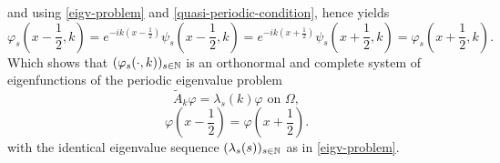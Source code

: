 and using \eqref{eigv-problem} and \eqref{quasi-periodic-condition}, hence yields
		\[ \varphi_{s}(x - \frac{1}{2}, k) = e^{-ik(x - \frac{1}{2})} \psi_{s}(x - \frac{1}{2}, k) = e^{-ik(x + \frac{1}{2})} \psi_{s}(x + \frac{1}{2}, k) = \varphi_{s}(x + \frac{1}{2}, k). \]
Which shows that $(\varphi_{s}(\cdot, k))_{s \in \mathbb{N}}$ is an orthonormal and complete system of eigenfunctions of the periodic eigenvalue problem
	\begin{equation}
		\tilde{A}_{k} \varphi = \lambda_{s}(k)
		 \varphi \text{ on } \Omega, \label{mod-eigv-problem}
	\end{equation}
	\begin{equation}
		 \varphi(x - \frac{1}{2}) = \varphi(x + \frac{1}{2}). \label{periodic-condition}
	\end{equation}
with the identical eigenvalue sequence $(\lambda_{s}(s))_{s \in \mathbb{N}}$ as in \eqref{eigv-problem}.